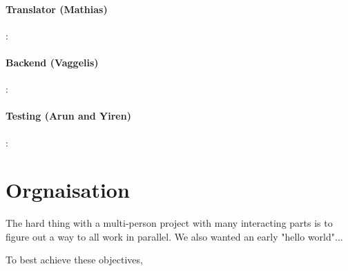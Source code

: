 \paragraph{Translator (Mathias)}:
\paragraph{Backend (Vaggelis)}:
\paragraph{Testing (Arun and Yiren)}:

\section{Orgnaisation}
The hard thing with a multi-person project with many interacting parts is to figure out a way to all work in parallel.
We also wanted an early "hello world"...

To best achieve these objectives, 
